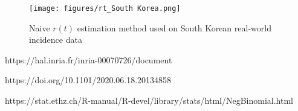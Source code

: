 \documentclass{article}
\newcommand{\nr}{r}
\begin{document}
\clearpage
\begin{figure}[h!]
    \centering
    \texttt{[image: figures/rt\_South Korea.png]}
    \caption{Naive $\nr(t)$ estimation method used on South Korean real-world incidence data}
    \label{fig:my_label}
\end{figure}



\begin{thebibliography}{1}
https://hal.inria.fr/inria-00070726/document
    
https://doi.org/10.1101/2020.06.18.20134858

https://stat.ethz.ch/R-manual/R-devel/library/stats/html/NegBinomial.html

\end{thebibliography}
\end{document}
